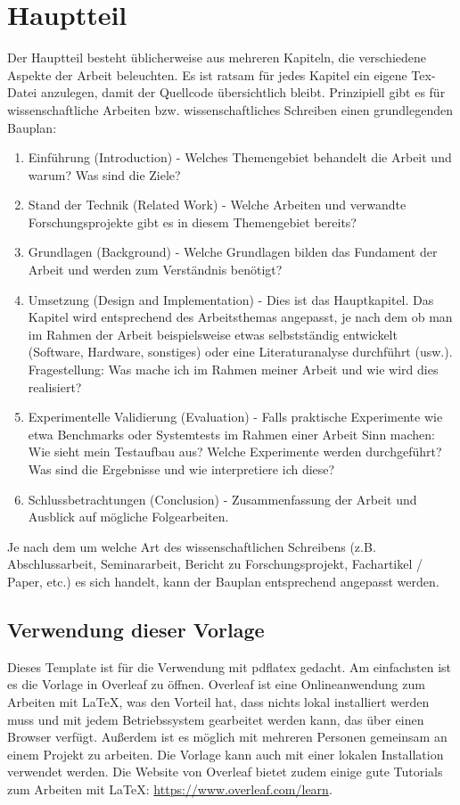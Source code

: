 \chapter{Hauptteil}
Der Hauptteil besteht üblicherweise aus mehreren Kapiteln, die verschiedene Aspekte der Arbeit beleuchten. Es ist ratsam für jedes Kapitel ein eigene Tex-Datei anzulegen, damit der Quellcode übersichtlich bleibt. Prinzipiell gibt es für wissenschaftliche Arbeiten bzw. wissenschaftliches Schreiben einen grundlegenden \glqq Bauplan\grqq{}:
\begin{enumerate}
    \item Einführung (Introduction) - Welches Themengebiet behandelt die Arbeit und warum? Was sind die Ziele?
    \item Stand der Technik (Related Work) - Welche Arbeiten und verwandte Forschungsprojekte gibt es in diesem Themengebiet bereits?
    \item Grundlagen (Background) - Welche Grundlagen bilden das Fundament der Arbeit und werden zum Verständnis benötigt?
    \item Umsetzung (Design and Implementation) - Dies ist das Hauptkapitel. Das Kapitel wird entsprechend des Arbeitsthemas angepasst, je nach dem ob man im Rahmen der Arbeit beispielsweise etwas selbstständig entwickelt (Software, Hardware, sonstiges) oder eine Literaturanalyse durchführt (usw.). Fragestellung: Was mache ich im Rahmen meiner Arbeit und wie wird dies realisiert?
    \item Experimentelle Validierung (Evaluation) - Falls praktische Experimente wie etwa Benchmarks oder Systemtests im Rahmen einer Arbeit Sinn machen: Wie sieht mein Testaufbau aus? Welche Experimente werden durchgeführt? Was sind die Ergebnisse und wie interpretiere ich diese?
    \item Schlussbetrachtungen (Conclusion) - Zusammenfassung der Arbeit und Ausblick auf mögliche Folgearbeiten.
\end{enumerate}
Je nach dem um welche Art des wissenschaftlichen Schreibens (z.B. Abschlussarbeit, Seminararbeit, Bericht zu Forschungsprojekt, Fachartikel / Paper, etc.) es sich handelt, kann der \glqq Bauplan\grqq{} entsprechend angepasst werden.

\section{Verwendung dieser Vorlage}
Dieses Template ist für die Verwendung mit pdflatex gedacht. Am einfachsten ist es die Vorlage in Overleaf zu öffnen. Overleaf ist eine Onlineanwendung zum Arbeiten mit \LaTeX{}, was den Vorteil hat, dass nichts lokal installiert werden muss und mit jedem Betriebssystem gearbeitet werden kann, das über einen Browser verfügt. Außerdem ist es möglich mit mehreren Personen gemeinsam an einem Projekt zu arbeiten. Die Vorlage kann auch mit einer lokalen Installation verwendet werden. Die Website von Overleaf bietet zudem einige gute Tutorials zum Arbeiten mit \LaTeX{}: \url{https://www.overleaf.com/learn}.

